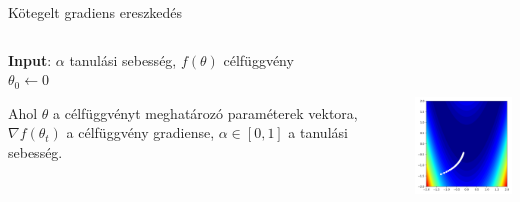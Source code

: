 \documentclass[english, aspectratio=169]{beamer}
\begin{document}
\begin{frame}{Kötegelt gradiens ereszkedés}
\begin{columns}
\begin{column}{.7\textwidth}
\begin{algorithm}[H]
\caption{Kötegelt gradiens ereszkedés}
\SetAlgoLined
\textbf{Input}: $\alpha$ tanulási sebesség, $f(\theta)$ célfüggvény\\
$\theta_0 \leftarrow 0$ 
\end{algorithm}
Ahol $\theta$ a célfüggvényt meghatározó paraméterek vektora, $\nabla f(\theta_t)$ a célfüggvény gradiense, $\alpha \in [0,1]$ a tanulási sebesség.
\end{column}
\begin{column}{.3\textwidth}
\begin{center}
\includegraphics[height=5cm, width=5cm, keepaspectratio]{images/gd_batch.png}
\end{center}
\end{column}
\end{columns}
\end{frame}
\end{document}
